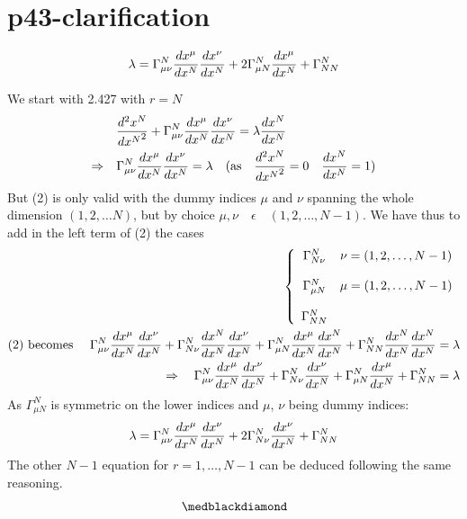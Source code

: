 \section{p43-clarification }
\begin{tcolorbox}
$$\lambda = \Gamma^N_{\mu \nu}\dv{x^{\mu}}{x^N} \dv{x^{\nu}}{x^N} + 2\Gamma^N_{\mu N}\dv{x^{\mu}}{x^N}+\Gamma^N_{N N} $$
\end{tcolorbox}
We start with 2.427 with $r=N$
\begin{align}
\ &\dv[2]{x^N}{{x^{N}}} + \Gamma^N_{\mu\nu}\dv{x^{\mu}}{x^N} \dv{x^{\nu}}{x^N} = \lambda \dv{x^N}{x^N}\\
\Rightarrow\quad &\Gamma^N_{\mu\nu}\dv{x^{\mu}}{x^N} \dv{x^{\nu}}{x^N} = \lambda \quad \text{(as}\quad \dv[2]{x^N}{{x^{N}}} = 0 \quad \dv{x^N}{x^N} = 1 \text{)}
\end{align}
But (2) is only valid with the dummy indices $\mu$ and $\nu$ spanning the whole dimension $(1,2,\dots N)$, but by choice $\mu,\nu \quad \epsilon \quad (1,2, \dots, N-1)$. We have thus to add in the left term of (2) the cases
\begin{align}
\left\{ \begin{array}{cc}
\Gamma^N_{N\nu}& \nu = (1,2,\dots ,N-1)\\\\
\Gamma^N_{\mu N}& \mu = (1,2,\dots ,N-1)\\\\
\Gamma^N_{NN}& \\
\end{array} \right.\\
\text{(2) becomes } \quad \Gamma^N_{\mu\nu}\dv{x^{\mu}}{x^N} \dv{x^{\nu}}{x^N} + \Gamma^N_{N \nu}\dv{x^N}{x^N} \dv{x^{\nu}}{x^N} + \Gamma^N_{\mu N}\dv{x^{\mu}}{x^N} \dv{x^{N}}{x^N} + \Gamma^N_{NN}\dv{x^{N}}{x^N} \dv{x^{N}}{x^N}= \lambda\\
\Rightarrow   \quad \Gamma^N_{\mu\nu}\dv{x^{\mu}}{x^N} \dv{x^{\nu}}{x^N} + \Gamma^N_{N \nu}\dv{x^{\nu}}{x^N} + \Gamma^N_{\mu N}\dv{x^{\mu}}{x^N}+ \Gamma^N_{NN} = \lambda
\end{align}
As $\Gamma^N_{\mu N}$ is symmetric on the lower indices and $\mu$, $\nu$ being dummy indices:
\begin{align}
\lambda  =\Gamma^N_{\mu\nu}\dv{x^{\mu}}{x^N} \dv{x^{\nu}}{x^N} + 2\Gamma^N_{N \nu}\dv{x^{\nu}}{x^N} +\Gamma^N_{NN}
\end{align}
The other $N-1$ equation for $r= 1,\dots, N-1$ can be deduced following the same reasoning.
$$\medblackdiamond$$
\newpage


